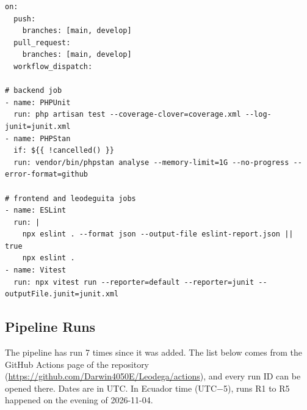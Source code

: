 \begin{minipage}{\linewidth}
\begin{lstlisting}[language={}]
on:
  push:
    branches: [main, develop]
  pull_request:
    branches: [main, develop]
  workflow_dispatch:

# backend job
- name: PHPUnit
  run: php artisan test --coverage-clover=coverage.xml --log-junit=junit.xml
- name: PHPStan
  if: ${{ !cancelled() }}
  run: vendor/bin/phpstan analyse --memory-limit=1G --no-progress --error-format=github

# frontend and leodeguita jobs
- name: ESLint
  run: |
    npx eslint . --format json --output-file eslint-report.json || true
    npx eslint .
- name: Vitest
  run: npx vitest run --reporter=default --reporter=junit --outputFile.junit=junit.xml
\end{lstlisting}
\end{minipage}

\subsection{Pipeline Runs}

The pipeline has run 7 times since it was added.
The list below comes from the GitHub Actions page of the repository (\url{https://github.com/Darwin4050E/Leodega/actions}), and every run ID can be opened there.
Dates are in UTC\@.
In Ecuador time (UTC$-$5), runs R1 to R5 happened on the evening of 2026-11-04.

